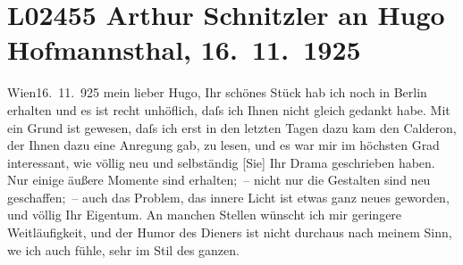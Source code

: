 

\section[Arthur Schnitzler an Hugo Hofmannsthal, 16. 11. 1925]{L02455 Arthur Schnitzler an Hugo Hofmannsthal, 16. 11. 1925}
\nopagebreak{}
\rehead{ }\normalsize\beginnumbering{}
\toendnotes[C]{\smallbreak\pagebreak[2]}
\toendnotes[C]{\smallbreak}
\pstart
           \raggedleft{}{\pb}Wien16. 11. 925\pend
           \vspace{0.5em}
\pstart
           mein lieber Hugo, Ihr schönes Stück hab ich noch in Berlin erhalten
               und es ist recht unhöflich, daſs ich Ihnen nicht gleich gedankt habe. Mit ein Grund
               ist gewesen, daſs ich erst in den letzten Tagen \introOben{}dazu kam\introOben{} den
                  Calderon, der Ihnen dazu eine Anregung gab, zu lesen, und es war mir im höchsten Grad
               interessant, wie völlig neu und selbständig {[}Sie{]} Ihr Drama geschrieben haben. Nur
               einige äußere Momente sind erhalten; – nicht nur die Gestalten sind neu geschaffen; –
               auch das Problem, das innere Licht ist etwas ganz neues geworden, und völlig Ihr
               Eigentum. An manchen Stellen wünscht ich mir geringere Weitläufigkeit, und der Humor
               des Dieners ist nicht durchaus nach meinem Sinn, we{\geminationn} ich
               auch fühle, sehr im Stil des ganzen.\pend
           
